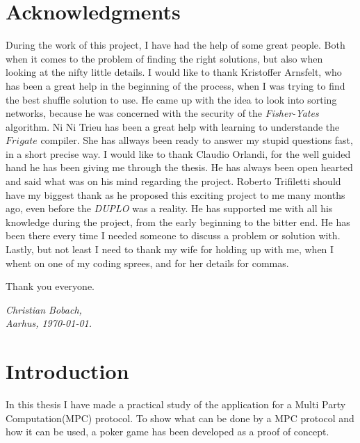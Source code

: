 \documentclass[twoside,11pt,openright]{report}
\newcommand{\FY}{\textit{Fisher-Yates} }
\newcommand{\DUPLO}{\textit{DUPLO} }
\begin{document}
\chapter*{Acknowledgments}
During the work of this project, I have had the help of some great people. Both when it comes to the problem of finding the right solutions, but also when looking at the nifty little details. I would like to thank Kristoffer Arnsfelt, who has been a great help in the beginning of the process, when I was trying to find the best shuffle solution to use. He came up with the idea to look into sorting networks, because he was concerned with the security of the \FY algorithm. Ni Ni Trieu has been a great help with learning to understande the $Frigate$ compiler. She has allways been ready to answer my stupid questions fast, in a short precise way. I would like to thank Claudio Orlandi, for the well guided hand he has been giving me through the thesis. He has always been open hearted and said what was on his mind regarding the project. Roberto Trifiletti should have my biggest thank as he proposed this exciting project to me many months ago, even before the \DUPLO was a reality. He has supported me with all his knowledge during the project, from the early beginning to the bitter end. He has been there every time I needed someone to discuss a problem or solution with. Lastly, but not least I need to thank my wife for holding up with me, when I whent on one of my coding sprees, and for her details for commas.

Thank you everyone.

\vspace{2ex}
\begin{flushright}
  \emph{Christian Bobach,}\\
  \emph{Aarhus, \today.}
\end{flushright}

\tableofcontents
{}
\setcounter{secnumdepth}{2}

\chapter{Introduction}
\label{ch:intro}
In this thesis I have made a practical study of the application for a Multi Party Computation(MPC) protocol. To show what can be done by a MPC protocol and how it can be used, a poker game has been developed as a proof of concept.
\end{document}
